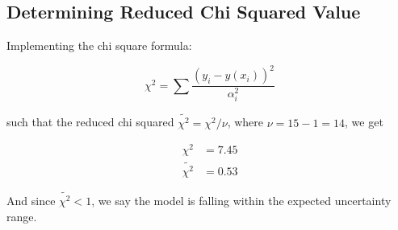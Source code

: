 \documentclass[svgnames]{article}     %
\begin{document}
\subsection{Determining Reduced Chi Squared Value}

Implementing the chi square formula: 

\[
\chi^2 = \sum \frac{(y_i - y(x_i))^2}{\alpha_i^2}
\] \vspace{5px}

such that the reduced chi squared $\tilde{\chi^2} = \chi^2 / \nu$, where $\nu
= 15 - 1 = 14$, we get

\begin{align*}
  \chi^2 &= 7.45 \\
  \tilde{\chi^2} &= 0.53
\end{align*}

And since $\tilde{\chi^2} < 1$, we say the model is falling within the expected
uncertainty range. 
\end{document}
